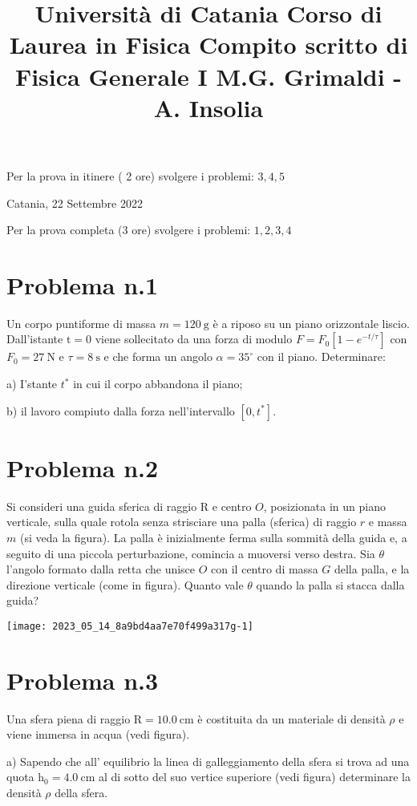 \documentclass[10pt]{article}
\title{Università di Catania 
 Corso di Laurea in Fisica 
 Compito scritto di Fisica Generale I 
 M.G. Grimaldi - A. Insolia }
\author{}
\date{}
\begin{document}
\maketitle
Per la prova in itinere ( 2 ore) svolgere i problemi: \(3,4,5\)

Catania, 22 Settembre 2022

Per la prova completa (3 ore) svolgere i problemi: \(1,2,3,4\)

\section{Problema n.1}
Un corpo puntiforme di massa \(m=120 \mathrm{~g}\) è a riposo su un piano orizzontale liscio. Dall'istante \(\mathrm{t}=0\) viene sollecitato da una forza di modulo \(F=F_{0}\left[1-e^{-t / \tau}\right]\) con \(F_{0}=27 \mathrm{~N}\) e \(\tau=8 \mathrm{~s}\) e che forma un angolo \(\alpha=35^{\circ}\) con il piano. Determinare:

a) I'stante \(t^{*}\) in cui il corpo abbandona il piano;

b) il lavoro compiuto dalla forza nell'intervallo \(\left[0, t^{*}\right]\).

\section{Problema n.2}
Si consideri una guida sferica di raggio \(\mathrm{R}\) e centro \(O\), posizionata in un piano verticale, sulla quale rotola senza strisciare una palla (sferica) di raggio \(r\) e massa \(m\) (si veda la figura). La palla è inizialmente ferma sulla sommità della guida e, a seguito di una piccola perturbazione, comincia a muoversi verso destra. Sia \(\theta\) l'angolo formato dalla retta che unisce \(O\) con il centro di massa \(G\) della palla, e la direzione verticale (come in figura). Quanto vale \(\theta\) quando la palla si stacca dalla guida?

\begin{center}
\texttt{[image: 2023\_05\_14\_8a9bd4aa7e70f499a317g-1]}
\end{center}

\section{Problema n.3}
Una sfera piena di raggio \(\mathrm{R}=10.0 \mathrm{~cm}\) è costituita da un materiale di densità \(\rho\) e viene immersa in acqua (vedi figura).

a) Sapendo che all' equilibrio la linea di galleggiamento della sfera si trova ad una quota \(\mathrm{h}_{0}=4.0 \mathrm{~cm}\) al di sotto del suo vertice superiore (vedi figura) determinare la densità \(\rho\) della sfera.
\end{document}
